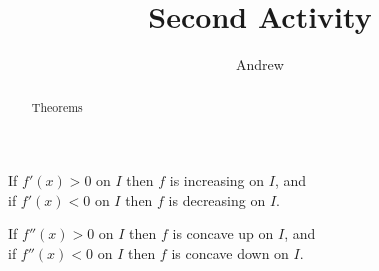 \documentclass{ximera}
\title{Second Activity}
\author{Andrew}
\begin{document}
\begin{abstract}
    Theorems
\end{abstract}
\maketitle

\begin{theorem}
    If $f'(x) >0$ on $I$ then $f$ is increasing on $I$, and\\
    if $f'(x) <0$ on $I$ then $f$ is decreasing on $I$.
\end{theorem}

\begin{theorem}
    If $f''(x) >0$ on $I$ then $f$ is concave up on $I$, and\\
    if $f''(x) <0$ on $I$ then $f$ is concave down on $I$.
\end{theorem}
\end{document}

